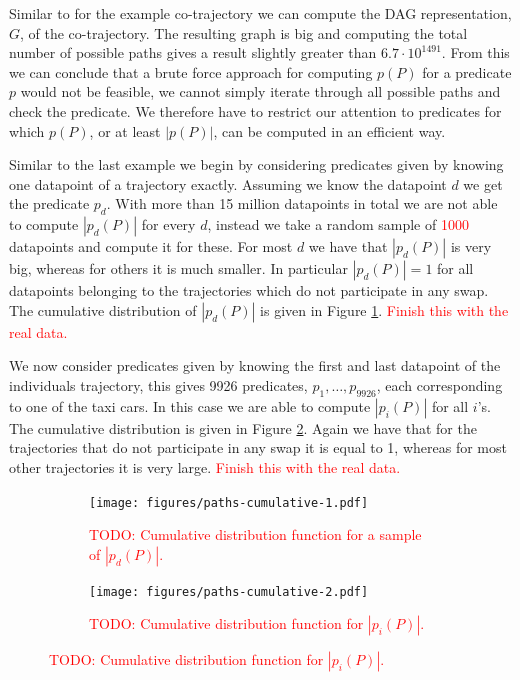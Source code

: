 \documentclass[12pt]{article}
\newcommand{\todo}[1]{\textcolor{red}{#1}}
\newcommand{\data}{d}
\newcommand{\pred}{p}
\newcommand{\DAG}{G}
\newcommand{\paths}{P}
\theoremstyle{definition}
\begin{document}
Similar to for the example co-trajectory we can compute the DAG
representation, \(\DAG\), of the co-trajectory. The resulting graph is
big and computing the total number of possible paths gives a result
slightly greater than \(6.7 \cdot 10^{1491}\). From this we can
conclude that a brute force approach for computing \(\pred(\paths)\)
for a predicate \(\pred\) would not be feasible, we cannot simply
iterate through all possible paths and check the predicate. We
therefore have to restrict our attention to predicates for which
\(\pred(\paths)\), or at least \(|\pred(\paths)|\), can be computed in
an efficient way.

Similar to the last example we begin by considering predicates given
by knowing one datapoint of a trajectory exactly. Assuming we know
the datapoint \(\data\) we get the predicate \(\pred_{\data}\). With
more than 15 million datapoints in total we are not able to compute
\(|\pred_{\data}(\paths)|\) for every \(\data\), instead we take a
random sample of \todo{1000} datapoints and compute it for these.
For most \(\data\) we have that \(|\pred_{\data}(\paths)|\) is very
big, whereas for others it is much smaller. In particular
\(|\pred_{\data}(\paths)| = 1\) for all datapoints belonging to the
trajectories which do not participate in any swap. The cumulative
distribution of \(|\pred_{\data}(\paths)|\) is given in Figure
\ref{fig:paths-cumulative-1}. \todo{Finish this with the real data.}

We now consider predicates given by knowing the first and last
datapoint of the individuals trajectory, this gives 9926 predicates,
\(\pred_{1}, \dots, \pred_{9926}\), each corresponding to one of the
taxi cars. In this case we are able to compute \(|\pred_{i}(\paths)|\)
for all \(i\)'s. The cumulative distribution is given in Figure
\ref{fig:paths-cumulative-2}. Again we have that for the trajectories
that do not participate in any swap it is equal to 1, whereas for most
other trajectories it is very large. \todo{Finish this with the real
  data.}

\begin{figure}
  \centering
  \begin{subfigure}[t]{0.49\textwidth}
    \texttt{[image: figures/paths-cumulative-1.pdf]}
    \caption{\todo{TODO: Cumulative distribution function for a sample
        of \(|\pred_{\data}(\paths)|\).}}
    \label{fig:paths-cumulative-1}
  \end{subfigure}
  \begin{subfigure}[t]{0.49\textwidth}
    \texttt{[image: figures/paths-cumulative-2.pdf]}
    \caption{\todo{TODO: Cumulative distribution function for
        \(|\pred_{i}(\paths)|\).}}
    \label{fig:paths-cumulative-2}
  \end{subfigure}
  \label{fig:paths-cumulative-1-2}
\end{figure}
\end{document}
